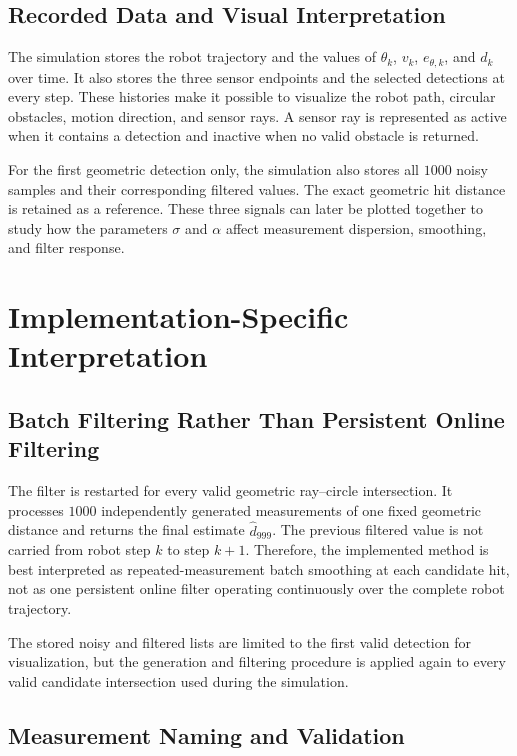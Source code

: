 \documentclass[10pt,twocolumn,a4paper]{article}
\begin{document}
\subsection{Recorded Data and Visual Interpretation}

The simulation stores the robot trajectory and the values of
$\theta_k$, $v_k$, $e_{\theta,k}$, and $d_k$ over time. It also stores
the three sensor endpoints and the selected detections at every step.
These histories make it possible to visualize the robot path, circular
obstacles, motion direction, and sensor rays. A sensor ray is represented
as active when it contains a detection and inactive when no valid
obstacle is returned.

For the first geometric detection only, the simulation also stores all
$1000$ noisy samples and their corresponding filtered values. The exact
geometric hit distance is retained as a reference. These three signals
can later be plotted together to study how the parameters $\sigma$ and
$\alpha$ affect measurement dispersion, smoothing, and filter response.

\section{Implementation-Specific Interpretation}

\subsection{Batch Filtering Rather Than Persistent Online Filtering}

The filter is restarted for every valid geometric ray--circle
intersection. It processes $1000$ independently generated measurements
of one fixed geometric distance and returns the final estimate
$\hat{d}_{999}$. The previous filtered value is not carried from robot
step $k$ to step $k+1$. Therefore, the implemented method is best
interpreted as repeated-measurement batch smoothing at each candidate
hit, not as one persistent online filter operating continuously over the
complete robot trajectory.

The stored noisy and filtered lists are limited to the first valid
detection for visualization, but the generation and filtering procedure
is applied again to every valid candidate intersection used during the
simulation.

\subsection{Measurement Naming and Validation}
\end{document}
